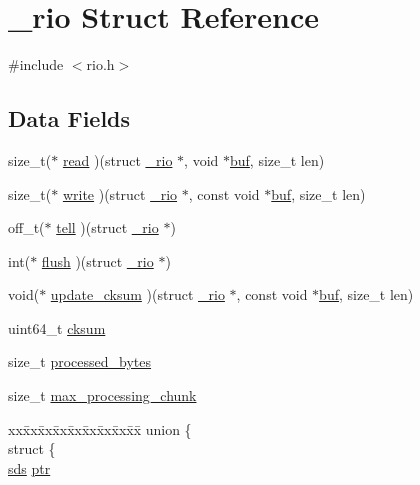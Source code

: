 \hypertarget{struct__rio}{}\section{\+\_\+rio Struct Reference}
\label{struct__rio}


{\ttfamily \#include $<$rio.\+h$>$}

\subsection*{Data Fields}
\begin{DoxyCompactItemize}
\item 
size\+\_\+t($\ast$ \hyperlink{struct__rio_a6562dde444181d8dc56163cd5bd5a880}{read} )(struct \hyperlink{struct__rio}{\+\_\+rio} $\ast$, void $\ast$\hyperlink{struct__rio_ae8dd93102163eea99d3d0949d1974628}{buf}, size\+\_\+t len)
\item 
size\+\_\+t($\ast$ \hyperlink{struct__rio_aa7c29e99e2a05a47c569af36fa61272c}{write} )(struct \hyperlink{struct__rio}{\+\_\+rio} $\ast$, const void $\ast$\hyperlink{struct__rio_ae8dd93102163eea99d3d0949d1974628}{buf}, size\+\_\+t len)
\item 
off\+\_\+t($\ast$ \hyperlink{struct__rio_ab06eb2e08a6cba498c63adf5e9ffa2ff}{tell} )(struct \hyperlink{struct__rio}{\+\_\+rio} $\ast$)
\item 
int($\ast$ \hyperlink{struct__rio_a6400f2e1372884609119ec5fa095b6b9}{flush} )(struct \hyperlink{struct__rio}{\+\_\+rio} $\ast$)
\item 
void($\ast$ \hyperlink{struct__rio_a0d11c9195df688114fd7e3d39b06c269}{update\+\_\+cksum} )(struct \hyperlink{struct__rio}{\+\_\+rio} $\ast$, const void $\ast$\hyperlink{struct__rio_ae8dd93102163eea99d3d0949d1974628}{buf}, size\+\_\+t len)
\item 
uint64\+\_\+t \hyperlink{struct__rio_aa7e1f76c805332914541fb978311b7b4}{cksum}
\item 
size\+\_\+t \hyperlink{struct__rio_a4bfc464c439f7f4da758b39d6f31cf22}{processed\+\_\+bytes}
\item 
size\+\_\+t \hyperlink{struct__rio_ad1ae3d0cef59f6c43a68302a5bc673cd}{max\+\_\+processing\+\_\+chunk}
\item 
\begin{tabbing}
xx\=xx\=xx\=xx\=xx\=xx\=xx\=xx\=xx\=\kill
union \{\\
\>struct \{\\
\>\>\hyperlink{sds_8h_ad69abac3df4532879db9642c95f5ef6f}{sds} \hyperlink{struct__rio_ac787a06d755eb260b16d6cf74c06eaf9}{ptr}\\

\end{tabbing}
\end{DoxyCompactItemize}
